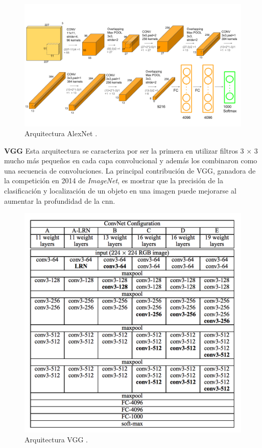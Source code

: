 \begin{figure}[H]
 \centering
  \includegraphics[scale=0.3,keepaspectratio=true,clip=true]{imagenes/MarcoTeorico/AlexNet-1.png}
  \caption{Arquitectura AlexNet \citep{alexnet}.}
	\label{Fig:alexnet}
\end{figure}


\par \textbf{VGG} \citep{vgg} Esta arquitectura se caracteriza por ser la primera en utilizar filtros 3 × 3 mucho más pequeños en cada capa convolucional y además los combinaron como una secuencia de convoluciones. La principal contribución de VGG, ganadora de la competición en 2014 de \textit{ImageNet}, es mostrar que la precisión de la clasificación y localización de un objeto en una imagen puede mejorarse al aumentar la profundidad de la \ac{cnn}.

\begin{figure}[H]
 \centering
  \includegraphics[scale=0.6,keepaspectratio=true,clip=true]{imagenes/MarcoTeorico/vgg.png}
  \caption{Arquitectura VGG \citep{vgg}.}
	\label{Fig:vgg}
\end{figure}

